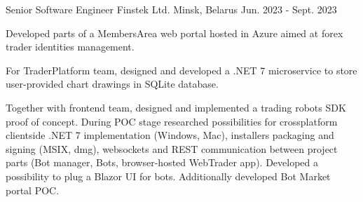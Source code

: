 

\begin{cventries}

  \cventry
    {Senior Software Engineer} %
    {Finstek Ltd.} %
    {Minsk, Belarus} %
    {Jun. 2023 - Sept. 2023} %
    {
      \begin{cvitems} %
        \item {Developed parts of a MembersArea web portal hosted in Azure aimed at forex trader identities management.}
        \item {For TraderPlatform team, designed and developed a .NET 7 microservice to store user-provided chart drawings in SQLite database.}
        \item {Together with frontend team, designed and implemented a trading robots SDK proof of concept. During POC stage researched possibilities for crossplatform clientside .NET 7 implementation (Windows, Mac), installers packaging and signing (MSIX, dmg), websockets and REST communication between project parts (Bot manager, Bots, browser-hosted WebTrader app). Developed a possibility to plug a Blazor UI for bots. Additionally developed Bot Market portal POC.}
      \end{cvitems}
    }


\end{cventries}
